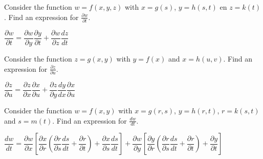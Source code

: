 \fi

\ifanalysis\begin{Exercise}[difficulty = 2]\fi\ifcalculus\begin{Exercise}[difficulty = 3]\fi Consider the function $w=f(x,y,z)$ with $x=g(s)$, $y=h(s,t)$ en $z=k(t)$. Find an expression for $\frac{\partial w}{\partial t}$.
\ifanalysis\end{Exercise}\fi\ifcalculus\end{Exercise}\fi

\begin{Answer}

    $\dfrac{\partial w}{ \partial t} = \dfrac{\partial w}{ \partial y} \dfrac{\partial y}{ \partial t} + \dfrac{\partial w}{ \partial z} \dfrac{dz}{dt}$
\end{Answer}

\ifanalysis\begin{Exercise}[difficulty = 2]\fi\ifcalculus\begin{Exercise}[difficulty = 3]\fi Consider the function $z=g(x,y)$ with $y=f(x)$ and $x=h(u,v)$. Find an expression for $\frac{\partial z}{\partial u}$.
\ifanalysis\end{Exercise}\fi\ifcalculus\end{Exercise}\fi

\begin{Answer}

    $\dfrac{\partial z}{ \partial u} = \dfrac{\partial z}{ \partial x} \dfrac{\partial x}{ \partial u} + \dfrac{\partial z}{ \partial y} \dfrac{dy}{dx} \dfrac{\partial x}{ \partial u}  $
\end{Answer}

\ifanalysis

\begin{Exercise}[difficulty = 3] Consider the function $w=f(x,y)$ with $x=g(r,s)$, $y=h(r,t)$, $r=k(s,t)$ and $s=m(t)$. Find an expression for $\frac{d w}{d t}$.
\end{Exercise}

\begin{Answer}

    $ \dfrac{dw}{dt}= \dfrac{\partial w}{ \partial x}   \left[ \dfrac{\partial x}{ \partial r}   \left(  \dfrac{\partial r}{ \partial s} \dfrac{ds}{dt}   + \dfrac{\partial r}{ \partial t}  \right)   + \dfrac{\partial x}{ \partial s} \dfrac{ds}{dt} \right]  + \dfrac{\partial w}{ \partial y}   \left[\dfrac{\partial y}{ \partial r}   \left(  \dfrac{\partial r}{ \partial s} \dfrac{ds}{dt}  + \dfrac{\partial r}{ \partial t}  \right)   + \dfrac{\partial y}{ \partial t} \right]   $
\end{Answer}


